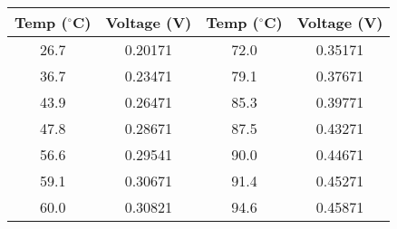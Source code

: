 \begin{tabular}{|c|c||c|c|}
    \hline
    \textbf{Temp ($^{\circ}$C)} & \textbf{Voltage (V)} & \textbf{Temp ($^{\circ}$C)} & \textbf{Voltage (V)} \\
    \hline
    26.7 & 0.20171 & 72.0 & 0.35171 \\
    36.7 & 0.23471 & 79.1 & 0.37671 \\
    43.9 & 0.26471 & 85.3 & 0.39771 \\
    47.8 & 0.28671 & 87.5 & 0.43271 \\
    56.6 & 0.29541 & 90.0 & 0.44671 \\
    59.1 & 0.30671 & 91.4 & 0.45271 \\
    60.0 & 0.30821 & 94.6 & 0.45871 \\
    \hline
\end{tabular}
